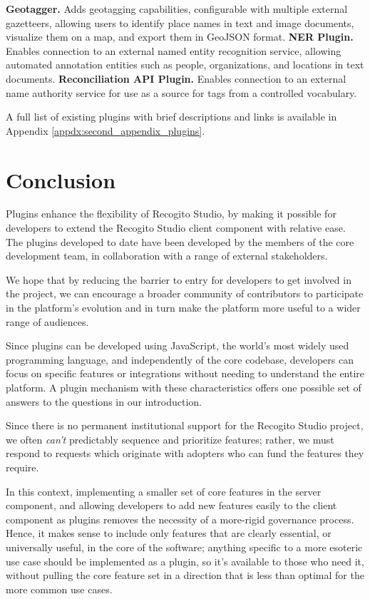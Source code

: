\documentclass[final]{anthology-ch}         %
\begin{document}
\noindent
\textbf{Geotagger.} Adds geotagging capabilities, configurable with multiple external gazetteers, allowing users to identify place names in text and image documents, visualize them on a map, and export them in GeoJSON format.
\noindent
\textbf{NER Plugin.} Enables connection to an external named entity recognition service, allowing automated annotation entities such as people, organizations, and locations in text documents.
\noindent
\textbf{Reconciliation API Plugin.} Enables connection to an external name authority service for use as a source for tags from a controlled vocabulary.

\noindent
\newline
A full list of existing plugins with brief descriptions and links is available in Appendix \ref{appdx:second_appendix_plugins}.

\section{Conclusion}

Plugins enhance the flexibility of Recogito Studio, by making it possible for developers to extend the Recogito Studio client component with relative ease. The plugins developed to date have been developed by the members of the core development team, in collaboration with a range of external stakeholders. 

We hope that by reducing the barrier to entry for developers to get involved in the project, we can encourage a broader community of contributors to participate in the platform's evolution and in turn make the platform more useful to a wider range of audiences.

Since plugins can be developed using JavaScript, the world's most widely used programming language, and independently of the core codebase, developers can focus on specific features or integrations without needing to understand the entire platform.  A plugin mechanism with these characteristics offers one possible set of answers to the questions in our introduction.
  
  Since there is no permanent institutional support for the Recogito Studio project, we often \textit{can't} predictably sequence and prioritize features; rather, we must respond to requests which originate with adopters who can fund the features they require. 
  
  In this context,  implementing a smaller set of core features in the server component, and allowing developers to add new features easily to the client component as plugins removes the necessity of a more-rigid governance process. Hence, it makes sense to include only features that are clearly essential, or universally useful, in the core of the software; anything specific to a more esoteric use case should be implemented as a plugin, so it's available to those who need it, without pulling the core feature set in a direction that is less than optimal for the more common use cases.
\end{document}
